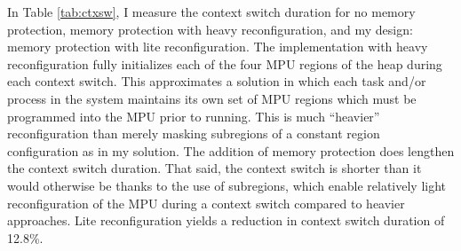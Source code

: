 In Table \ref{tab:ctxsw}, I measure the context switch duration for no memory protection, memory protection with heavy reconfiguration, and my design: memory protection with lite reconfiguration. The implementation with heavy reconfiguration fully initializes each of the four MPU regions of the heap during each context switch. This approximates a solution in which each task and/or process in the system maintains its own set of MPU regions which must be programmed into the MPU prior to running. This is much ``heavier'' reconfiguration than merely masking subregions of a constant region configuration as in my solution. The addition of memory protection does lengthen the context switch duration. That said, the context switch is shorter than it would otherwise be thanks to the use of subregions, which enable relatively light reconfiguration of the MPU during a context switch compared to heavier approaches. Lite reconfiguration yields a reduction in context switch duration of 12.8\%.
